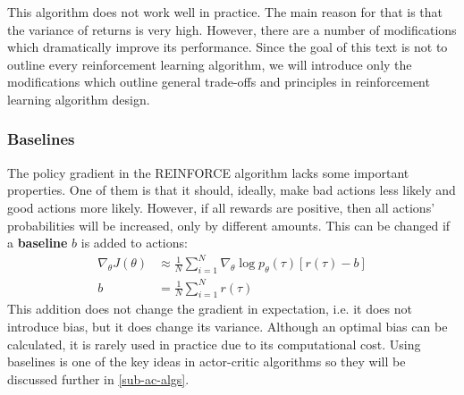 
This algorithm does not work well in practice.
The main reason for that is that the variance of returns
is very high. 
However, there are a number of modifications which dramatically improve its performance.
Since the goal of this text is not to outline every reinforcement learning algorithm,
we will introduce only the modifications which outline
general trade-offs and principles in reinforcement learning algorithm design.

\subsubsection{Baselines}
The policy gradient in the REINFORCE algorithm lacks some important properties.
One of them is that it should, ideally, make bad actions less likely
and good actions more likely. 
However, if all rewards are positive, then all actions' probabilities will be increased,
only by different amounts.
This can be changed if a \textbf{baseline } $ b  $ is added to actions:
\begin{align}
		\nabla_\theta J(\theta) &\approx 
		\frac{1}{N} \sum_{i=1}^{N}
		\nabla_\theta \log p_\theta (\tau) [ r(\tau) - b] \\
		b &= \frac{1}{N} \sum_{i=1}^{N} r(\tau)
\end{align}
This addition does not change the gradient in expectation, i.e. it does not
introduce bias,
but it does change its variance.
Although an optimal bias can be calculated, it is rarely used in practice due
to its computational cost.
Using baselines is one of the key ideas in actor-critic algorithms
so they will be discussed further in \ref{sub-ac-algs}.


